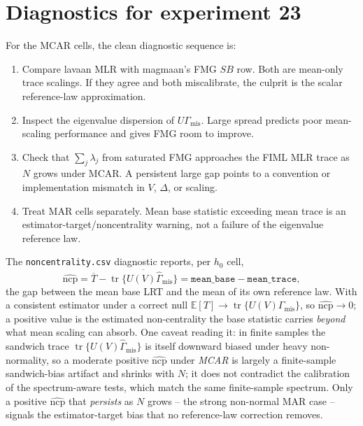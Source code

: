 \documentclass[11pt]{article}
\newcommand{\E}{\mathbb{E}}
\newcommand{\tr}{\operatorname{tr}}
\begin{document}
\section*{Diagnostics for experiment 23}

For the MCAR cells, the clean diagnostic sequence is:
\begin{enumerate}
  \item Compare lavaan MLR with magmaan's FMG \(SB\) row. Both are mean-only
        trace scalings. If they agree and both miscalibrate, the culprit is the
        scalar reference-law approximation.
  \item Inspect the eigenvalue dispersion of \(U\Gamma_{\mathrm{mis}}\). Large
        spread predicts poor mean-scaling performance and gives FMG room to
        improve.
  \item Check that
        \(\sum_j\lambda_j\) from saturated FMG approaches the FIML MLR trace as
        \(N\) grows under MCAR. A persistent large gap points to a convention or
        implementation mismatch in \(V\), \(\Delta\), or scaling.
  \item Treat MAR cells separately. Mean base statistic exceeding mean trace is
        an estimator-target/noncentrality warning, not a failure of the
        eigenvalue reference law.
\end{enumerate}

The \texttt{noncentrality.csv} diagnostic reports, per \(h_0\) cell,
\[
  \widehat{\mathrm{ncp}}
    =
  \overline{T} - \overline{\tr\{U(V)\hat\Gamma_{\mathrm{mis}}\}}
    =
  \texttt{mean\_base} - \texttt{mean\_trace},
\]
the gap between the mean base LRT and the mean of its own reference law. With a
consistent estimator under a correct null \(\E[T]\to\tr\{U(V)
\Gamma_{\mathrm{mis}}\}\), so \(\widehat{\mathrm{ncp}}\to 0\); a positive value
is the estimated non-centrality the base statistic carries \emph{beyond} what
mean scaling can absorb. One caveat reading it: in finite samples the sandwich
trace \(\tr\{U(V)\hat\Gamma_{\mathrm{mis}}\}\) is itself downward biased under
heavy non-normality, so a moderate positive \(\widehat{\mathrm{ncp}}\) under
\emph{MCAR} is largely a finite-sample sandwich-bias artifact and shrinks with
\(N\); it does not contradict the calibration of the spectrum-aware tests,
which match the same finite-sample spectrum. Only a positive
\(\widehat{\mathrm{ncp}}\) that \emph{persists} as \(N\) grows -- the strong
non-normal MAR case -- signals the estimator-target bias that no reference-law
correction removes.
\end{document}
